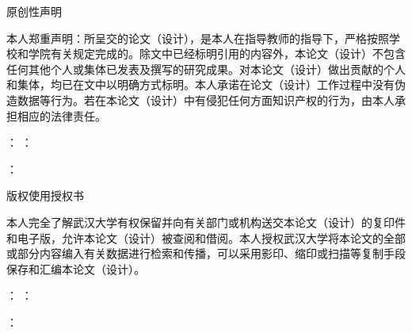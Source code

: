 \thispagestyle{empty}

\begin{center}
    \heiti {} 原创性声明
\end{center}

 \songti 本人郑重声明：所呈交的论文（设计），是本人在指导教师的指导下，严格按照学校和学院有关规定完成的。除文中已经标明引用的内容外，本论文（设计）不包含任何其他个人或集体已发表及撰写的研究成果。对本论文（设计）做出贡献的个人和集体，均已在文中以明确方式标明。本人承诺在论文（设计）工作过程中没有伪造数据等行为。若在本论文（设计）中有侵犯任何方面知识产权的行为，由本人承担相应的法律责任。 

\vspace{0.75cm}

\begin{center}
    \hspace{2cm} %
    ： \hspace{1cm} ：

    \hspace{2cm}
    ： \hspace{1cm} 
\end{center}

\vspace{2cm}

\begin{center}
    \heiti {} 版权使用授权书
\end{center}

 \songti 本人完全了解武汉大学有权保留并向有关部门或机构送交本论文（设计）的复印件和电子版，允许本论文（设计）被查阅和借阅。本人授权武汉大学将本论文的全部或部分内容编入有关数据进行检索和传播，可以采用影印、缩印或扫描等复制手段保存和汇编本论文（设计）。

\vspace{0.75cm}

\begin{center}
    \hspace{2cm} %
    ： \hspace{1cm} ：

    \hspace{2cm}
    ： \hspace{1cm} 
\end{center}

\clearpage